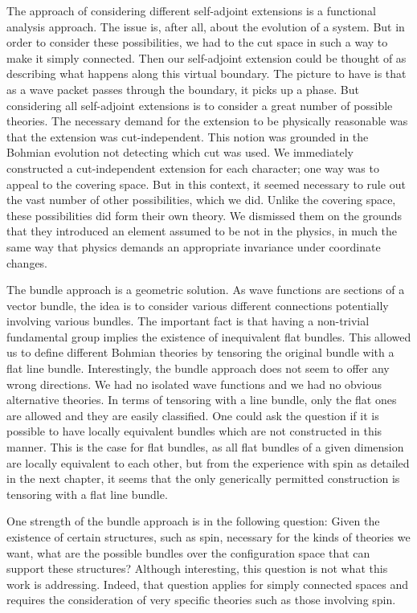 \documentclass[11pt]{article}
\theoremstyle{remark}
\begin{document}
The approach of considering different self-adjoint extensions is a
functional analysis approach. The issue is, after all, about the
evolution of a system. But in order to consider these possibilities,
we had to the cut space in such a way to make it simply
connected. Then our self-adjoint extension could be thought of as
describing what happens along this virtual boundary. The picture to
have is that 
as a wave packet passes through the boundary, it picks up a phase. But
considering all self-adjoint extensions is to consider a great number
of possible theories. The necessary demand for the extension to be
physically reasonable was that the extension was cut-independent. This
notion was grounded in the Bohmian evolution not detecting which cut
was used. 
 We immediately constructed a cut-independent extension for each
character; one way was to appeal to the covering space. But in this
context, it seemed necessary to rule out the vast number of other
possibilities, which we did.  Unlike the covering space, these
possibilities  did form their own theory. We dismissed them 
on the grounds that  
 they  introduced an element assumed to be not  in the physics, in
much the same way that physics demands an appropriate 
invariance under coordinate changes. 

The bundle approach is a geometric solution. As wave functions are sections of
a vector bundle,  the idea is to consider various different
connections potentially involving various bundles. 
The important fact is that having a non-trivial fundamental group 
implies the  existence of inequivalent flat bundles. 
 This allowed us to define different Bohmian
theories by tensoring the original bundle with a flat line bundle. 
Interestingly, 
the bundle approach does not seem to  offer any wrong directions. 
We had no isolated
wave functions and we had no obvious alternative theories. In terms of
tensoring with a line bundle, only the flat ones are allowed and they
are easily classified. One could ask the question if it is possible to
have locally equivalent bundles which are not constructed in this
manner. This is the case for flat bundles, 
as all flat bundles of a given dimension are
locally equivalent to each other, 
but from the experience with spin as detailed in the next chapter, 
it seems that the only generically
permitted construction is tensoring with a flat line bundle. 


One strength of the bundle approach is in the following question:
 Given the existence
of certain structures, such as spin,
 necessary for the kinds of theories we want,
what are the possible bundles over the configuration space that can
support these structures? 
Although interesting, this question is not what this work is
 addressing.  Indeed, that question applies for simply
connected spaces and requires the consideration of very specific theories
such as those involving spin. 
\end{document}
